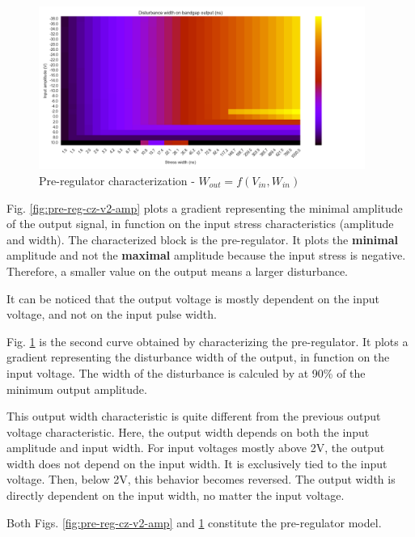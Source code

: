 \begin{figure}[!hp]
  \centering
  \includegraphics[width=0.95\textwidth]{src/4/figures/vpre_cz_V2_width.png}
  \caption{Pre-regulator characterization - $W_{out} = f(V_{in}, W_{in})$}
  \label{fig:pre-reg-cz-v2-width}
\end{figure}

Fig. \ref{fig:pre-reg-cz-v2-amp} plots a gradient representing the minimal amplitude of the output signal,
in function on the input stress characteristics (amplitude and width).
The characterized block is the pre-regulator.
It plots the \textbf{minimal} amplitude and not the \textbf{maximal} amplitude because the input stress is negative.
Therefore, a smaller value on the output means a larger disturbance.

It can be noticed that the output voltage is mostly dependent on the input voltage, and not on the input pulse width.

Fig. \ref{fig:pre-reg-cz-v2-width} is the second curve obtained by characterizing the pre-regulator.
It plots a gradient representing the disturbance width of the output, in function on the input voltage.
The width of the disturbance is calculed by at 90\% of the minimum output amplitude.

This output width characteristic is quite different from the previous output voltage characteristic.
Here, the output width depends on both the input amplitude and input width.
For input voltages mostly above 2V, the output width does not depend on the input width.
It is exclusively tied to the input voltage.
Then, below 2V, this behavior becomes reversed. The output width is directly dependent on the input width,
no matter the input voltage.

Both Figs. \ref{fig:pre-reg-cz-v2-amp} and \ref{fig:pre-reg-cz-v2-width} constitute the pre-regulator model.

